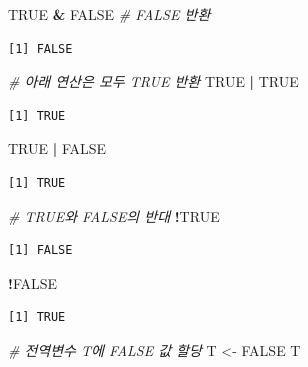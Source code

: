 \documentclass[
  11pt,
]{krantz}
\newenvironment{Shaded}{\begin{snugshade}}{\end{snugshade}}
\newcommand{\CommentTok}[1]{\textcolor[rgb]{0.37,0.37,0.37}{\textit{#1}}}
\newcommand{\NormalTok}[1]{#1}
\newcommand{\OperatorTok}[1]{\textcolor[rgb]{0.43,0.43,0.43}{\textbf{#1}}}
\newcommand{\OtherTok}[1]{\textcolor[rgb]{0.37,0.37,0.37}{#1}}
\newcommand{\StringTok}[1]{\textcolor[rgb]{0.5,0.5,0.5}{#1}}
\begin{document}
\begin{Shaded}
\begin{Highlighting}[]
\OtherTok{TRUE} \OperatorTok{&}\StringTok{ }\OtherTok{FALSE}  \CommentTok{# FALSE 반환}
\end{Highlighting}
\end{Shaded}

\begin{verbatim}
[1] FALSE
\end{verbatim}

\begin{Shaded}
\begin{Highlighting}[]
\CommentTok{# 아래 연산은 모두 TRUE 반환}
\OtherTok{TRUE} \OperatorTok{|}\StringTok{ }\OtherTok{TRUE}
\end{Highlighting}
\end{Shaded}

\begin{verbatim}
[1] TRUE
\end{verbatim}

\begin{Shaded}
\begin{Highlighting}[]
\OtherTok{TRUE} \OperatorTok{|}\StringTok{ }\OtherTok{FALSE}
\end{Highlighting}
\end{Shaded}

\begin{verbatim}
[1] TRUE
\end{verbatim}

\begin{Shaded}
\begin{Highlighting}[]
\CommentTok{# TRUE와 FALSE의 반대}
\OperatorTok{!}\OtherTok{TRUE}
\end{Highlighting}
\end{Shaded}

\begin{verbatim}
[1] FALSE
\end{verbatim}

\begin{Shaded}
\begin{Highlighting}[]
\OperatorTok{!}\OtherTok{FALSE}
\end{Highlighting}
\end{Shaded}

\begin{verbatim}
[1] TRUE
\end{verbatim}

\begin{Shaded}
\begin{Highlighting}[]
\CommentTok{# 전역변수 T에 FALSE 값 할당}
\NormalTok{T <-}\StringTok{ }\OtherTok{FALSE}
\NormalTok{T}
\end{Highlighting}
\end{Shaded}
\end{document}
